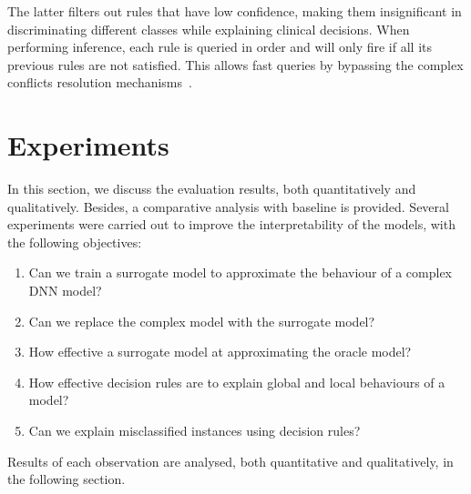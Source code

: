\hspace*{3.5mm} The latter filters out rules that have low confidence, making them insignificant in discriminating different classes while explaining clinical decisions. When performing inference, each rule is queried in order and will only fire if all its previous rules are not satisfied. This allows fast queries by bypassing the complex conflicts resolution mechanisms~\cite{ribeiro2018anchors}. 



\section{Experiments} \label{chapter_7:results}
In this section, we discuss the evaluation results, both quantitatively and qualitatively. Besides, a comparative analysis with baseline is provided. Several experiments were carried out to improve the interpretability of the models, with the following objectives: 

\begin{enumerate}[noitemsep]
    \item Can we train a surrogate model to approximate the behaviour of a complex DNN model? 
    \item Can we replace the complex model with the surrogate model? 
    \item How effective a surrogate model at approximating the oracle model?  
    \item How effective decision rules are to explain global and local behaviours of a model?   
    \item Can we explain misclassified instances using decision rules? 
\end{enumerate}

\hspace*{3.5mm} Results of each observation are analysed, both quantitative and qualitatively, in the following section. 

